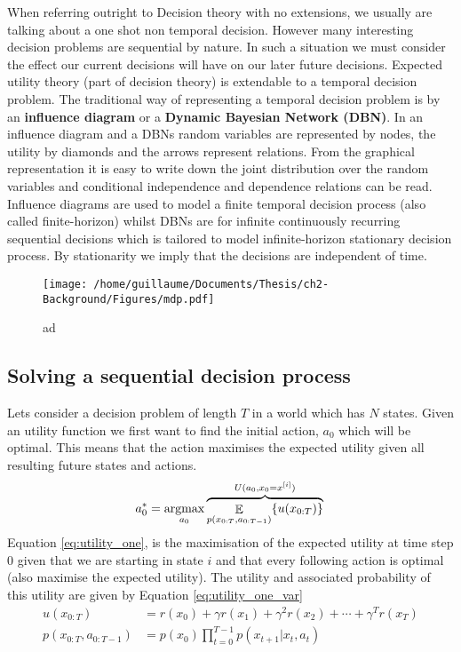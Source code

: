 When referring outright to Decision theory with no extensions, we usually are talking about a one shot
non temporal decision. However many interesting decision problems are sequential by nature.
In such a situation we must consider the effect our current decisions will have on our later future decisions. Expected utility 
theory (part of decision theory) is extendable to a temporal decision problem. The traditional way of 
representing a temporal decision problem is by an \textbf{influence diagram} or a \textbf{Dynamic Bayesian Network (DBN)}. 
In an influence diagram and a DBNs random variables are represented by nodes, the utility by diamonds and the arrows represent 
relations. From the graphical representation it is easy to write down the joint distribution over the random variables and 
conditional independence and dependence relations can be read. Influence diagrams are used to model a finite temporal decision 
process (also called finite-horizon) whilst DBNs are for infinite continuously recurring sequential decisions 
which is tailored to model infinite-horizon stationary decision process. By stationarity we imply that the 
decisions are independent of time. 

\begin{figure}[h]
 \centering
 \texttt{[image: /home/guillaume/Documents/Thesis/ch2-Background/Figures/mdp.pdf]}
  \caption{ad}
\end{figure}

\subsection{Solving a sequential decision process}

Lets consider a decision problem of length $T$ in a world which has $N$ states. 
Given an utility function we first want to find the initial action, $a_0$ which will
be optimal. This means that the action maximises the expected utility 
given all resulting future states and actions. 
\begin{equation}\label{eq:utility_one}
	a^*_0 = \argmax_{a_0}  \overbrace{\displaystyle \mathop{\mathbb{E}}_{p(x_{0:T},a_{0:T-1})} \{ u(x_{0:T}) \}}^{U(a_0,x_0=x^{[i]})} \\
\end{equation}
Equation \ref{eq:utility_one}, is the maximisation of the expected utility at time step $0$ given that we are 
starting in state $i$ and that every following action is optimal (also maximise the expected 
utility). The utility and associated probability of this utility are given by Equation  \ref{eq:utility_one_var}
\begin{align}\label{eq:utility_one_var}
  u(x_{0:T}) 	     &= r(x_0) + \gamma r(x_1) + \gamma^2 r(x_2) + \cdots + \gamma^{T} r(x_T)\\
  p(x_{0:T},a_{0:T-1}) &= p(x_0) \prod_{t=0}^{T-1} p(x_{t+1}|x_t,a_t)
\end{align}

